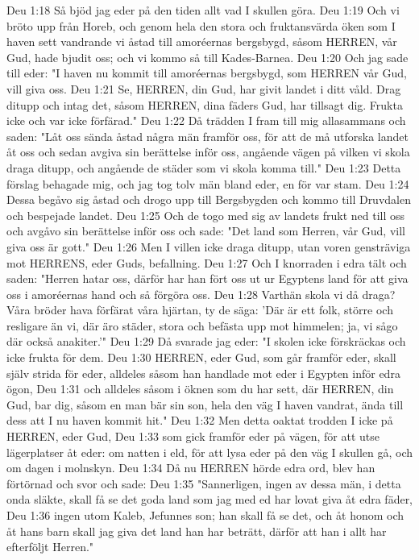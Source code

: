 Deu 1:18  Så bjöd jag eder på den tiden allt vad I skullen göra.
Deu 1:19  Och vi bröto upp från Horeb, och genom hela den stora och fruktansvärda öken som I haven sett vandrande vi åstad till amoréernas bergsbygd, såsom HERREN, vår Gud, hade bjudit oss; och vi kommo så till Kades-Barnea.
Deu 1:20  Och jag sade till eder: "I haven nu kommit till amoréernas bergsbygd, som HERREN vår Gud, vill giva oss.
Deu 1:21  Se, HERREN, din Gud, har givit landet i ditt våld. Drag ditupp och intag det, såsom HERREN, dina fäders Gud, har tillsagt dig. Frukta icke och var icke förfärad."
Deu 1:22  Då trädden I fram till mig allasammans och saden: "Låt oss sända åstad några män framför oss, för att de må utforska landet åt oss och sedan avgiva sin berättelse inför oss, angående vägen på vilken vi skola draga ditupp, och angående de städer som vi skola komma till."
Deu 1:23  Detta förslag behagade mig, och jag tog tolv män bland eder, en för var stam.
Deu 1:24  Dessa begåvo sig åstad och drogo upp till Bergsbygden och kommo till Druvdalen och bespejade landet.
Deu 1:25  Och de togo med sig av landets frukt ned till oss och avgåvo sin berättelse inför oss och sade: "Det land som Herren, vår Gud, vill giva oss är gott."
Deu 1:26  Men I villen icke draga ditupp, utan voren gensträviga mot HERRENS, eder Guds, befallning.
Deu 1:27  Och I knorraden i edra tält och saden: "Herren hatar oss, därför har han fört oss ut ur Egyptens land för att giva oss i amoréernas hand och så förgöra oss.
Deu 1:28  Varthän skola vi då draga? Våra bröder hava förfärat våra hjärtan, ty de säga: 'Där är ett folk, större och resligare än vi, där äro städer, stora och befästa upp mot himmelen; ja, vi sågo där också anakiter.'"
Deu 1:29  Då svarade jag eder: "I skolen icke förskräckas och icke frukta för dem.
Deu 1:30  HERREN, eder Gud, som går framför eder, skall själv strida för eder, alldeles såsom han handlade mot eder i Egypten inför edra ögon,
Deu 1:31  och alldeles såsom i öknen som du har sett, där HERREN, din Gud, bar dig, såsom en man bär sin son, hela den väg I haven vandrat, ända till dess att I nu haven kommit hit."
Deu 1:32  Men detta oaktat trodden I icke på HERREN, eder Gud,
Deu 1:33  som gick framför eder på vägen, för att utse lägerplatser åt eder: om natten i eld, för att lysa eder på den väg I skullen gå, och om dagen i molnskyn.
Deu 1:34  Då nu HERREN hörde edra ord, blev han förtörnad och svor och sade:
Deu 1:35  "Sannerligen, ingen av dessa män, i detta onda släkte, skall få se det goda land som jag med ed har lovat giva åt edra fäder,
Deu 1:36  ingen utom Kaleb, Jefunnes son; han skall få se det, och åt honom och åt hans barn skall jag giva det land han har beträtt, därför att han i allt har efterföljt Herren."
